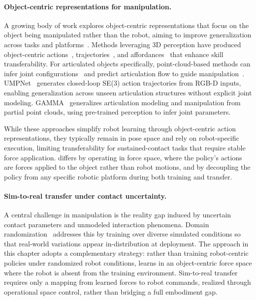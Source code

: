 \paragraph{Object-centric representations for manipulation.}
A growing body of work explores object-centric representations that focus on the object being manipulated rather than the robot, aiming to improve generalization across tasks and platforms~\citep{kroemer2021review}. Methods leveraging 3D perception have produced object-centric actions~\citep{mo2021where2act}, trajectories~\citep{wu2021vatmart}, and affordances~\citep{geng2023rlafford} that enhance skill transferability. For articulated objects specifically, point-cloud-based methods can infer joint configurations~\citep{yu2024gamma} and predict articulation flow to guide manipulation~\citep{eisner2022flowbot3d}. UMPNet~\citep{xu2022umpnet} generates closed-loop SE(3) action trajectories from RGB-D inputs, enabling generalization across unseen articulation structures without explicit joint modeling. GAMMA~\citep{yu2024gamma} generalizes articulation modeling and manipulation from partial point clouds, using pre-trained perception to infer joint parameters.

While these approaches simplify robot learning through object-centric action representations, they typically remain in pose space and rely on robot-specific execution, limiting transferability for sustained-contact tasks that require stable force application. \FLEX{} differs by operating in force space, where the policy's actions are forces applied to the object rather than robot motions, and by decoupling the policy from any specific robotic platform during both training and transfer.

\paragraph{Sim-to-real transfer under contact uncertainty.}
A central challenge in manipulation is the reality gap induced by uncertain contact parameters and unmodeled interaction phenomena. Domain randomization~\citep{tobin2017domain,peng2018sim} addresses this by training over diverse simulated conditions so that real-world variations appear in-distribution at deployment. The approach in this chapter adopts a complementary strategy: rather than training robot-centric policies under randomized robot conditions, \FLEX{} learns in an object-centric force space where the robot is absent from the training environment. Sim-to-real transfer requires only a mapping from learned forces to robot commands, realized through operational space control, rather than bridging a full embodiment gap.

